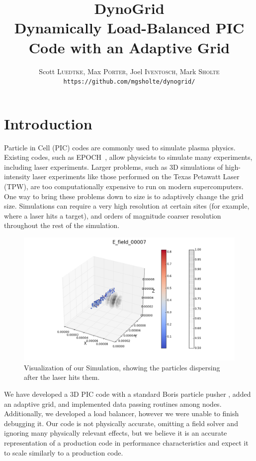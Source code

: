\documentclass[]{article}
\begin{document}
\title{DynoGrid\\{\Large Dynamically Load-Balanced PIC Code with an Adaptive Grid}}

\author{Scott \textsc{Luedtke}, Max \textsc{Porter}, Joel \textsc{Iventosch}, Mark \textsc{Sholte}\\\texttt{https://github.com/mgsholte/dynogrid/}}

\maketitle

\section{Introduction}

Particle in Cell (PIC) codes are commonly used to simulate plasma physics.  Existing codes, such as EPOCH~\cite{epoch}, allow physicists to simulate many experiments, including laser experiments.  Larger problems, such as 3D simulations of high-intensity laser experiments like those performed on the Texas Petawatt Laser (TPW), are too computationally expensive to run on modern supercomputers.  One way to bring these problems down to size is to adaptively change the grid size.  Simulations can require a very high resolution at certain sites (for example, where a laser hits a target), and orders of magnitude coarser resolution throughout the rest of the simulation.
\begin{figure}[h]
    \centering
    \includegraphics[width=15cm]{viz_1.png}
    \caption{Visualization of our Simulation, showing the particles dispersing after the laser hits them.}
\end{figure}
We have developed a 3D PIC code with a standard Boris particle pusher \cite{bird}, added an adaptive grid, and implemented data passing routines among nodes.  Additionally, we developed a load balancer, however we were unable to finish debugging it.  Our code is not physically accurate, omitting a field solver and ignoring many physically relevant effects, but we believe it is an accurate representation of a production code in performance characteristics and expect it to scale similarly to a production code.
\end{document}
